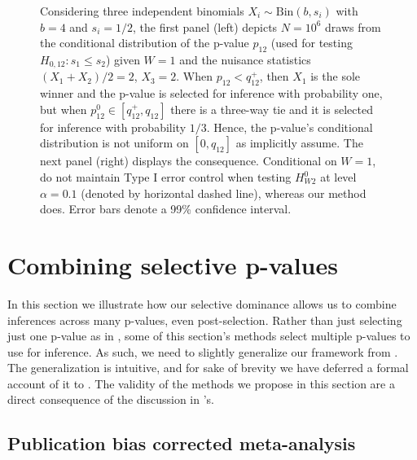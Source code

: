 \documentclass{article}
\begin{document}
\begin{figure}[]
    \caption{Considering three independent binomials $X_i \sim \text{Bin}(b, s_i)$ with $b=4$ and $s_i = 1/2$, the first panel (left) depicts $N=10^6$ draws from the conditional distribution of the p-value $p_{12}$ (used for testing $H_{0, 12}: s_1 \leq s_2$) given $W = 1$ and the nuisance statistics $(X_1 + X_2)/2 = 2$, $X_3=2$. When $p_{12}  < q^+_{12}$, then $X_1$ is the sole winner and the p-value is selected for inference with probability one, but when $p_{12}^0 \in [q^+_{12}, q_{12}]$ there is a three-way tie and it is selected for inference with probability $1/3$. Hence, the p-value's conditional distribution is not uniform on $[0, q_{12}]$ as \cite{Hung2019} implicitly assume. The next panel (right) displays the consequence. Conditional on $W=1$, \cite{Hung2019} do not maintain Type I error control when testing $H^{0}_{W2}$ at level $\alpha=0.1$ (denoted by horizontal dashed line), whereas our method does. Error bars denote a 99\% confidence interval.}
    \label{fig:error_control}
\end{figure}

\section{Combining selective p-values}
\label{sec:multiple}

In this section we illustrate how our selective dominance allows us to combine inferences across many p-values, even post-selection. Rather than just selecting just one p-value as in , some of this section's methods select multiple p-values to use for inference. As such, we need to slightly generalize our framework from . The generalization is intuitive, and for sake of brevity we have deferred a formal account of it to . The validity of the methods we propose in this section are a direct consequence of the discussion in  's. 

\subsection{Publication bias corrected meta-analysis}
\end{document}

